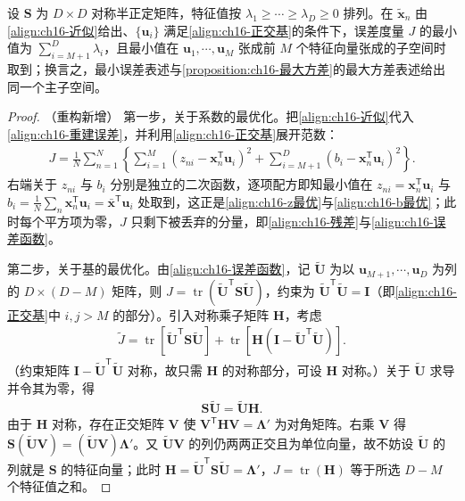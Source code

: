\documentclass[../../main.tex]{subfiles}
\begin{document}
\begin{proposition}[最小误差表述与最大方差表述的等价性]\label{proposition:ch16-最小误差}
设 $\bm{S}$ 为 $D\times D$ 对称半正定矩阵，特征值按 $\lambda_1\geqslant\cdots\geqslant\lambda_D\geqslant0$ 排列。在 $\tilde{\bm{x}}_n$ 由\eqref{align:ch16-近似}给出、$\{\bm{u}_i\}$ 满足\eqref{align:ch16-正交基}的条件下，误差度量 $J$ 的最小值为 $\sum_{i=M+1}^{D}\lambda_i$，且最小值在 $\bm{u}_1,\cdots,\bm{u}_M$ 张成前 $M$ 个特征向量张成的子空间时取到；换言之，最小误差表述与\cref{proposition:ch16-最大方差}的最大方差表述给出同一个主子空间。
\end{proposition}

\begin{proof}（重构新增）
第一步，关于系数的最优化。把\eqref{align:ch16-近似}代入\eqref{align:ch16-重建误差}，并利用\eqref{align:ch16-正交基}展开范数：
\begin{align*}
  J=\frac{1}{N}\sum_{n=1}^{N}\left\{\sum_{i=1}^{M}\left(z_{ni}-\bm{x}_n^{\mathsf T}\bm{u}_i\right)^2+\sum_{i=M+1}^{D}\left(b_i-\bm{x}_n^{\mathsf T}\bm{u}_i\right)^2\right\}.
\end{align*}
右端关于 $z_{ni}$ 与 $b_i$ 分别是独立的二次函数，逐项配方即知最小值在 $z_{ni}=\bm{x}_n^{\mathsf T}\bm{u}_i$ 与 $b_i=\frac{1}{N}\sum_n\bm{x}_n^{\mathsf T}\bm{u}_i=\bar{\bm{x}}^{\mathsf T}\bm{u}_i$ 处取到，这正是\eqref{align:ch16-z最优}与\eqref{align:ch16-b最优}；此时每个平方项为零，$J$ 只剩下被丢弃的分量，即\eqref{align:ch16-残差}与\eqref{align:ch16-误差函数}。

第二步，关于基的最优化。由\eqref{align:ch16-误差函数}，记 $\tilde{\bm{U}}$ 为以 $\bm{u}_{M+1},\cdots,\bm{u}_D$ 为列的 $D\times(D-M)$ 矩阵，则 $J=\operatorname{tr}(\tilde{\bm{U}}^{\mathsf T}\bm{S}\tilde{\bm{U}})$，约束为 $\tilde{\bm{U}}^{\mathsf T}\tilde{\bm{U}}=\bm{I}$（即\eqref{align:ch16-正交基}中 $i,j>M$ 的部分）。引入对称乘子矩阵 $\bm{H}$，考虑
\begin{align}
  \tilde{J}=\operatorname{tr}\left[\tilde{\bm{U}}^{\mathsf T}\bm{S}\tilde{\bm{U}}\right]+\operatorname{tr}\left[\bm{H}\left(\bm{I}-\tilde{\bm{U}}^{\mathsf T}\tilde{\bm{U}}\right)\right].
  \label{align:ch16-误差矩阵形式}
\end{align}
（约束矩阵 $\bm{I}-\tilde{\bm{U}}^{\mathsf T}\tilde{\bm{U}}$ 对称，故只需 $\bm{H}$ 的对称部分，可设 $\bm{H}$ 对称。）关于 $\tilde{\bm{U}}$ 求导并令其为零，得
\begin{align*}
  \bm{S}\tilde{\bm{U}}=\tilde{\bm{U}}\bm{H}.
\end{align*}
由于 $\bm{H}$ 对称，存在正交矩阵 $\bm{V}$ 使 $\bm{V}^{\mathsf T}\bm{H}\bm{V}=\bm{\Lambda}'$ 为对角矩阵。右乘 $\bm{V}$ 得 $\bm{S}(\tilde{\bm{U}}\bm{V})=(\tilde{\bm{U}}\bm{V})\bm{\Lambda}'$。又 $\tilde{\bm{U}}\bm{V}$ 的列仍两两正交且为单位向量，故不妨设 $\tilde{\bm{U}}$ 的列就是 $\bm{S}$ 的特征向量；此时 $\bm{H}=\tilde{\bm{U}}^{\mathsf T}\bm{S}\tilde{\bm{U}}=\bm{\Lambda}'$，$J=\operatorname{tr}(\bm{H})$ 等于所选 $D-M$ 个特征值之和。


\end{proof}
\end{document}
